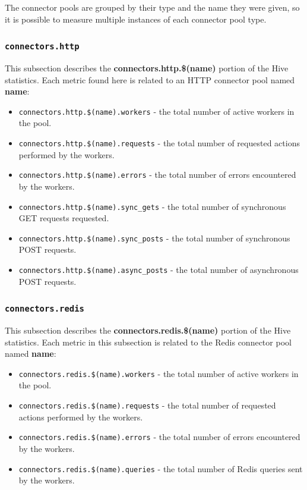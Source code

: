 \documentclass[a4paper]{article}
\begin{document}
\noindent
The connector pools are grouped by their type and the name they were given, so it is possible to measure multiple instances of each connector pool type.
\subsubsection{\texttt{connectors.http}}
\label{sec-4-2-12}

This subsection describes the \textbf{connectors.http.\$(name)} portion of the Hive statistics. Each metric found here is related to an HTTP connector pool named \textbf{name}:


\begin{itemize}
\item \texttt{connectors.http.\$(name).workers} - the total number of active workers in the pool.
\item \texttt{connectors.http.\$(name).requests} - the total number of requested actions performed by the workers.
\item \texttt{connectors.http.\$(name).errors} - the total number of errors encountered by the workers.
\item \texttt{connectors.http.\$(name).sync\_gets} - the total number of synchronous GET requests requested.
\item \texttt{connectors.http.\$(name).sync\_posts} - the total number of synchronous POST requests.
\item \texttt{connectors.http.\$(name).async\_posts} - the total number of asynchronous POST requests.
\end{itemize}
\subsubsection{\texttt{connectors.redis}}
\label{sec-4-2-13}

This subsection describes the \textbf{connectors.redis.\$(name)} portion of the Hive statistics. Each metric in this subsection is related to the Redis connector pool named \textbf{name}:


\begin{itemize}
\item \texttt{connectors.redis.\$(name).workers} - the total number of active workers in the pool.
\item \texttt{connectors.redis.\$(name).requests} - the total number of requested actions performed by the workers.
\item \texttt{connectors.redis.\$(name).errors} - the total number of errors encountered by the workers.
\item \texttt{connectors.redis.\$(name).queries} - the total number of Redis queries sent by the workers.
\end{itemize}
\end{document}
